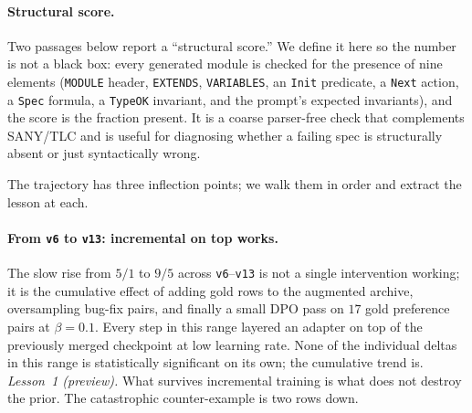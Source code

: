 \documentclass[11pt]{article}
\begin{document}
\paragraph{Structural score.} Two passages below report a ``structural
score.'' We define it here so the number is not a black box: every
generated module is checked for the presence of nine elements
(\texttt{MODULE} header, \texttt{EXTENDS}, \texttt{VARIABLES}, an
\texttt{Init} predicate, a \texttt{Next} action, a \texttt{Spec}
formula, a \texttt{TypeOK} invariant, and the prompt's expected
invariants), and the score is the fraction present. It is a coarse
parser-free check that complements SANY/TLC and is useful for
diagnosing whether a failing spec is structurally absent or just
syntactically wrong.

\noindent The trajectory has three inflection points; we walk them in
order and extract the lesson at each.

\paragraph{From \texttt{v6} to \texttt{v13}: incremental on top works.}
The slow rise from $5/1$ to $9/5$ across \texttt{v6}--\texttt{v13} is
not a single intervention working; it is the cumulative effect of
adding gold rows to the augmented archive, oversampling bug-fix pairs,
and finally a small DPO pass on $17$ gold preference pairs at
$\beta=0.1$. Every step in this range layered an adapter on top of the
previously merged checkpoint at low learning rate. None of the
individual deltas in this range is statistically significant on its
own; the cumulative trend is. \emph{Lesson~1 (preview).} What survives
incremental training is what does not destroy the prior. The
catastrophic counter-example is two rows down.
\end{document}

